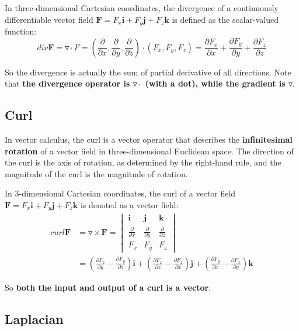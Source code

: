 \documentclass[12pt]{article}
\numberwithin{equation}{section}
\begin{document}
In three-dimensional Cartesian coordinates, the divergence of a continuously differentiable vector field $\mathbf{F} = F_{x}\mathbf{i} +F_{y}\mathbf{j} +F_{z}\mathbf{k}$ is defined as the scalar-valued function:
\begin{equation}
div \mathbf{F} = \triangledown \cdot F = (\frac{\partial}{\partial x}, \frac{\partial}{\partial y}, \frac{\partial}{\partial z}) \cdot (F_x, F_y, F_z) = \frac{\partial F_x}{\partial x} + \frac{\partial F_y}{\partial y} + \frac{\partial F_z}{\partial z}
\end{equation}

So the divergence is actually the sum of partial derivative of all directions. Note that \textbf{the divergence operator is $\triangledown \cdot$ (with a dot), while the gradient is $\triangledown$}. 

\subsection{Curl}

In vector calculus, the curl is a vector operator that describes the \textbf{infinitesimal rotation} of a vector field in three-dimensional Euclidean space. The direction of the curl is the axis of rotation, as determined by the right-hand rule, and the magnitude of the curl is the magnitude of rotation.

In 3-dimensional Cartesian coordinates, the curl of a vector field $\mathbf{F} = F_{x}\mathbf{i} +F_{y}\mathbf{j} +F_{z}\mathbf{k}$ is denoted as a vector field:
\begin{align*}
curl \mathbf{F} &= \triangledown \times \mathbf{F} = 
\begin{vmatrix}
\mathbf{i} & \mathbf{j} & \mathbf{k}\\
\frac{\partial}{\partial x} & \frac{\partial}{\partial y} & \frac{\partial}{\partial z}\\
F_x & F_y & F_z
\end{vmatrix} \\
&= (\frac{\partial F_z}{\partial y} - \frac{\partial F_y}{\partial z})\mathbf{i} + (\frac{\partial F_x}{\partial z} - \frac{\partial F_z}{\partial x})\mathbf{j} + (\frac{\partial F_y}{\partial x} - \frac{\partial F_x}{\partial y})\mathbf{k}
\end{align*}

So \textbf{both the input and output of a curl is a vector}.

\subsection{Laplacian}
\end{document}
